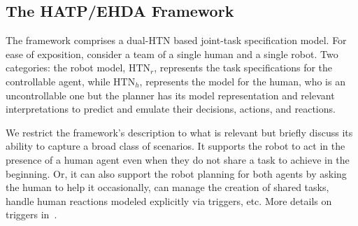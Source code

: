 \documentclass[letterpaper]{article} %
\begin{document}
\subsection{The HATP/EHDA Framework}
The framework comprises a dual-HTN based joint-task specification model.   
For ease of exposition, consider a team of a single human and a single robot. Two categories: the robot model, $\mathrm{HTN}_{r}$, represents the task specifications for the controllable agent, while $\mathrm{HTN}_{h}$, represents the model for the human, who is an uncontrollable one but the planner has its model
representation and relevant interpretations to predict and emulate their decisions, actions, and reactions. 


We restrict the framework's description to what is relevant but briefly discuss its ability to capture a broad class of scenarios. It supports the robot to act in the presence of a human agent even when they do not share a task to achieve in the beginning. Or, it can also support the robot planning for both agents by asking the human to help it occasionally, can manage the creation of shared tasks, handle human reactions modeled explicitly via triggers, etc. More details on triggers  in~\cite{ingrand1996prs,AlamiCFGI98}.   
\end{document}

